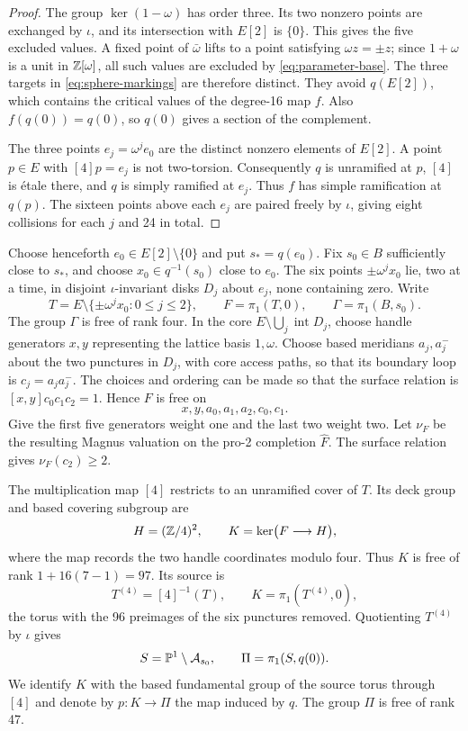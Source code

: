 \begin{proof}
The group $\ker(1-\omega)$ has order three.  Its two nonzero points are
exchanged by $\iota$, and its intersection with $E[2]$ is $\{0\}$.
This gives the five excluded values.  A fixed point of $\bar\omega$
lifts to a point satisfying $\omega z=\pm z$; since $1+\omega$ is a
unit in $\mathbb Z[\omega]$, all such values are excluded by
\eqref{eq:parameter-base}.  The three targets in
\eqref{eq:sphere-markings} are therefore distinct.  They avoid
$q(E[2])$, which contains the critical values of the degree-16 map $f$.
Also $f(q(0))=q(0)$, so $q(0)$ gives a section of the complement.

The three points $e_j=\omega^j e_0$ are the distinct nonzero elements
of $E[2]$.  A point $p\in E$ with $[4]p=e_j$ is not two-torsion.
Consequently $q$ is unramified at $p$, $[4]$ is \'etale there, and $q$
is simply ramified at $e_j$.  Thus $f$ has simple ramification at
$q(p)$.  The sixteen points above each $e_j$ are paired freely by
$\iota$, giving eight collisions for each $j$ and 24 in total.
\end{proof}

Choose henceforth $e_0\in E[2]\setminus\{0\}$ and put $s_*=q(e_0)$.
Fix $s_0\in B$ sufficiently close to $s_*$, and choose
$x_0\in q^{-1}(s_0)$ close to $e_0$.  The six points
$\pm\omega^j x_0$ lie, two at a time, in disjoint $\iota$-invariant
disks $D_j$ about $e_j$, none containing zero.  Write
\[
 T=E\setminus\{\pm\omega^j x_0:0\le j\le2\},\qquad
 F=\pi_1(T,0),\qquad \Gamma=\pi_1(B,s_0).
\]
The group $\Gamma$ is free of rank four.  In the core
$E\setminus\bigcup_j\operatorname{int}D_j$, choose handle generators
$x,y$ representing the lattice basis $1,\omega$.  Choose based
meridians $a_j,a_j^-$ about the two punctures in
$D_j$, with core access paths, so that its boundary loop is
$c_j=a_ja_j^-$.  The choices and ordering can be made so that the
surface relation is $[x,y]c_0c_1c_2=1$.  Hence $F$ is free on
\begin{equation}\label{eq:torus-free-basis}
 x,y,a_0,a_1,a_2,c_0,c_1.
\end{equation}
Give the first five generators weight one and the last two weight
two.  Let $\nu_F$ be the resulting Magnus valuation on the pro-2
completion $\widehat F$.  The surface relation gives $\nu_F(c_2)\ge2$.

The multiplication map $[4]$ restricts to an unramified cover of $T$.
Its deck group and based covering subgroup are
\[
 H=(\mathbb Z/4)^2,\qquad
 K=\ker\bigl(F\longrightarrow H\bigr),
\]
where the map records the two handle coordinates modulo four.
Thus $K$ is free of rank $1+16(7-1)=97$.  Its source is
\[
 T^{(4)}=[4]^{-1}(T),\qquad K=\pi_1(T^{(4)},0),
\]
the torus with the 96 preimages of the six punctures removed.
Quotienting $T^{(4)}$ by $\iota$ gives
\[
 S=\mathbb P^1\setminus\mathcal A_{s_0},\qquad
 \Pi=\pi_1(S,q(0)).
\]
We identify $K$ with the based fundamental group of the source torus
through $[4]$ and denote by $p:K\to\Pi$ the map induced by $q$.
The group $\Pi$ is free of rank 47.

